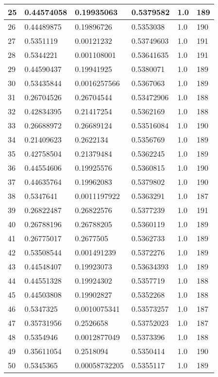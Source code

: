 \begin{longtable}{|l|l|l|l|l|l|}
25 & 0.44574058 & 0.19935063 & 0.5379582 & 1.0 & 189 \\ \hline 
26 & 0.44489875 & 0.19896726 & 0.5353038 & 1.0 & 190 \\ \hline 
27 & 0.5351119 & 0.00121232 & 0.53749603 & 1.0 & 191 \\ \hline 
28 & 0.5344221 & 0.001108001 & 0.53641635 & 1.0 & 191 \\ \hline 
29 & 0.44590437 & 0.19941925 & 0.5380071 & 1.0 & 189 \\ \hline 
30 & 0.53435844 & 0.0016257566 & 0.5367063 & 1.0 & 189 \\ \hline 
31 & 0.26704526 & 0.26704544 & 0.53472906 & 1.0 & 188 \\ \hline 
32 & 0.42834395 & 0.21417254 & 0.5362169 & 1.0 & 188 \\ \hline 
33 & 0.26688972 & 0.26689124 & 0.53516084 & 1.0 & 190 \\ \hline 
34 & 0.21409623 & 0.2622134 & 0.5356769 & 1.0 & 189 \\ \hline 
35 & 0.42758504 & 0.21379484 & 0.5362245 & 1.0 & 189 \\ \hline 
36 & 0.44554606 & 0.19925576 & 0.5360815 & 1.0 & 190 \\ \hline 
37 & 0.44635764 & 0.19962083 & 0.5379802 & 1.0 & 190 \\ \hline 
38 & 0.5347641 & 0.0011197922 & 0.5363291 & 1.0 & 187 \\ \hline 
39 & 0.26822487 & 0.26822576 & 0.5377239 & 1.0 & 191 \\ \hline 
40 & 0.26788196 & 0.26788205 & 0.5360119 & 1.0 & 189 \\ \hline 
41 & 0.26775017 & 0.2677505 & 0.5362733 & 1.0 & 189 \\ \hline 
42 & 0.53508544 & 0.001491239 & 0.5372276 & 1.0 & 189 \\ \hline 
43 & 0.44548407 & 0.19923073 & 0.53634393 & 1.0 & 189 \\ \hline 
44 & 0.44551328 & 0.19924302 & 0.5357719 & 1.0 & 188 \\ \hline 
45 & 0.44503808 & 0.19902827 & 0.5352268 & 1.0 & 188 \\ \hline 
46 & 0.5347325 & 0.0010075341 & 0.53573257 & 1.0 & 187 \\ \hline 
47 & 0.35731956 & 0.2526658 & 0.53752023 & 1.0 & 187 \\ \hline 
48 & 0.5354946 & 0.0012877049 & 0.5373396 & 1.0 & 188 \\ \hline 
49 & 0.35611054 & 0.2518094 & 0.5350414 & 1.0 & 190 \\ \hline 
50 & 0.5345365 & 0.00058732205 & 0.5355117 & 1.0 & 189 \\ \hline 
\end{longtable}